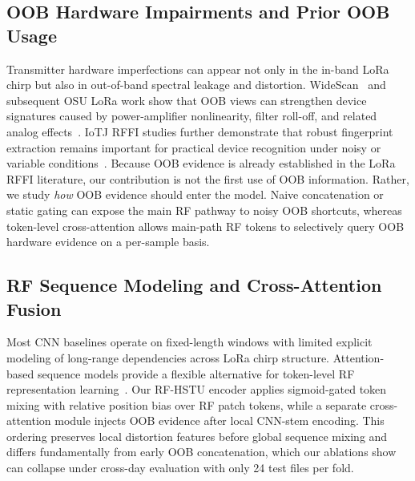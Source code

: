 \subsection{OOB Hardware Impairments and Prior OOB Usage}
Transmitter hardware imperfections can appear not only in the in-band LoRa chirp but also in out-of-band spectral leakage and distortion.
WideScan~\cite{elmaghbub2020widescan} and subsequent OSU LoRa work show that OOB views can strengthen device signatures caused by power-amplifier nonlinearity, filter roll-off, and related analog effects~\cite{hamdaoui2022deeplearning}.
IoTJ RFFI studies further demonstrate that robust fingerprint extraction remains important for practical device recognition under noisy or variable conditions~\cite{zhou2021robust_rffi_iotj,xie2018coherent_rff_iotj}.
Because OOB evidence is already established in the LoRa RFFI literature, our contribution is not the first use of OOB information.
Rather, we study \emph{how} OOB evidence should enter the model.
Naive concatenation or static gating can expose the main RF pathway to noisy OOB shortcuts, whereas token-level cross-attention allows main-path RF tokens to selectively query OOB hardware evidence on a per-sample basis.

\subsection{RF Sequence Modeling and Cross-Attention Fusion}
Most CNN baselines operate on fixed-length windows with limited explicit modeling of long-range dependencies across LoRa chirp structure.
Attention-based sequence models provide a flexible alternative for token-level RF representation learning~\cite{vaswani2017attention}.
Our RF-HSTU encoder applies sigmoid-gated token mixing with relative position bias over RF patch tokens, while a separate cross-attention module injects OOB evidence after local CNN-stem encoding.
This ordering preserves local distortion features before global sequence mixing and differs fundamentally from early OOB concatenation, which our ablations show can collapse under cross-day evaluation with only 24 test files per fold.

